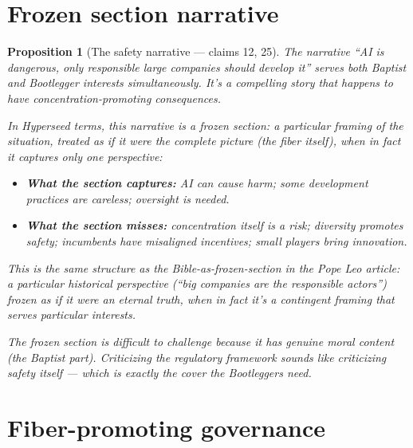 \documentclass[11pt,a4paper]{article}
\newtheorem{proposition}[definition]{Proposition}
\begin{document}

\section{Frozen section narrative}
\label{sec:narrative}

\begin{proposition}[The safety narrative --- claims 12, 25]
\label{prop:narrative}
The narrative ``AI is dangerous, only responsible large companies
should develop it'' serves both Baptist and Bootlegger interests
simultaneously. It's a compelling story that happens to have
concentration-promoting consequences.

In Hyperseed terms, this narrative is a \emph{frozen section}: a
particular framing of the situation, treated as if it were the
complete picture (the fiber itself), when in fact it captures only
one perspective:
\begin{itemize}
\item \textbf{What the section captures:} AI can cause harm; some
  development practices are careless; oversight is needed.
\item \textbf{What the section misses:} concentration itself is a
  risk; diversity promotes safety; incumbents have misaligned
  incentives; small players bring innovation.
\end{itemize}

This is the same structure as the Bible-as-frozen-section in the
Pope Leo article: a particular historical perspective (``big
companies are the responsible actors'') frozen as if it were an
eternal truth, when in fact it's a contingent framing that serves
particular interests.

The frozen section is difficult to challenge because it has genuine
moral content (the Baptist part). Criticizing the regulatory
framework sounds like criticizing safety itself --- which is exactly
the cover the Bootleggers need.
\end{proposition}


\section{Fiber-promoting governance}
\label{sec:alternative}
\end{document}
